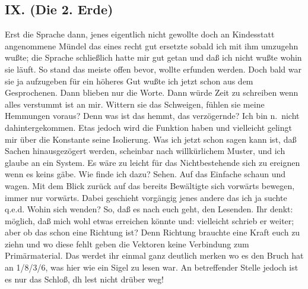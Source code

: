 \documentclass[
]{article}
\author{}
\date{\vspace{-2.5em}}
\begin{document}
\subsection{IX. (Die 2. Erde)}\label{ix.-die-2.-erde}

Erst die Sprache dann, jenes eigentlich nicht gewollte doch an
Kindesstatt angenommene Mündel das eines recht gut ersetzte sobald ich
mit ihm umzugehn wußte; die Sprache schließlich hatte mir gut getan und
daß ich nicht wußte wohin sie läuft. So stand das meiste offen bevor,
wollte erfunden werden. Doch bald war sie ja aufzugeben für ein höheres
Gut wußte ich jetzt schon aus dem Gesprochenen. Dann blieben nur die
Worte. Dann würde Zeit zu schreiben wenn alles verstummt ist an mir.
Wittern sie das Schweigen, fühlen sie meine Hemmungen voraus? Denn was
ist das hemmt, das verzögernde? Ich bin n.~nicht dahintergekommen. Etas
jedoch wird die Funktion haben und vielleicht gelingt mir über die
Konstante seine Isolierung. Was ich jetzt schon sagen kann ist, daß
Sachen hinausgezögert werden, scheinbar nach willkürlichem Muster, und
ich glaube an ein System. Es wäre zu leicht für das Nichtbestehende sich
zu ereignen wenn es keins gäbe. Wie finde ich dazu? Sehen. Auf das
Einfache schaun und wagen. Mit dem Blick zurück auf das bereits
Bewältigte sich vorwärts bewegen, immer nur vorwärts. Dabei geschieht
vorgängig jenes andere das ich ja suchte q.e.d. Wohin sich wenden? So,
daß es nach euch geht, den Lesenden. Ihr denkt: möglich, daß mich wohl
etwas erreichen könnte und: vielleicht schrieb er weiter; aber ob das
schon eine Richtung ist? Denn Richtung brauchte eine Kraft euch zu ziehn
und wo diese fehlt geben die Vektoren keine Verbindung zum
Primärmaterial. Das werdet ihr einmal ganz deutlich merken wo es den
Bruch hat an 1/8/3/6, was hier wie ein Sigel zu lesen war. An
betreffender Stelle jedoch ist es nur das Schloß, dh lest nicht drüber
weg!
\end{document}
